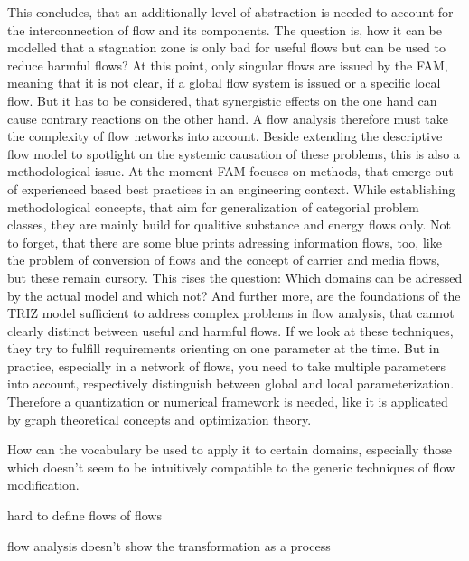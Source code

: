 \documentclass[a4paper,11pt]{article}
\begin{document}
        This concludes, that an additionally level of abstraction is needed to account for the interconnection of flow and its components. The question
        is, how it can be modelled that a stagnation zone is only bad for useful flows but can be used to reduce harmful flows?
        At this point, only singular flows are issued by the FAM, meaning that it is not clear, if a global flow system is issued or a specific local flow.
        But it has to be considered, that synergistic effects on the one hand can cause contrary reactions on the other hand. A flow analysis therefore must 
        take the complexity of flow networks into account. Beside extending the descriptive flow model to spotlight on the systemic causation of these problems, 
        this is also a methodological issue. At the moment FAM focuses on methods, that emerge out of experienced based best practices in an engineering context.
        While establishing methodological concepts, that aim for generalization of categorial problem classes,
        they are mainly build for qualitive substance and energy flows only. Not to forget, that there are some blue prints adressing information flows, too, like
        the problem of conversion of flows and the concept of carrier and media flows, but these remain cursory.
        This rises the question: Which domains can be adressed by the actual model and which not? And further more, are the foundations of the TRIZ model sufficient to address complex problems in flow analysis, that cannot clearly distinct between
        useful and harmful flows. If we look at these techniques, they try to fulfill requirements orienting on one parameter at the time.
        But in practice, especially in a network of flows, you need to take multiple parameters into account, respectively distinguish between global and local
        parameterization. Therefore a quantization or numerical framework is needed, like it is applicated by graph theoretical concepts and optimization theory. 
        
         



         

        How can the vocabulary be used to apply it to certain domains, especially those which doesn't seem to be intuitively compatible to the generic techniques
        of flow modification. 


        hard to define flows of flows

        flow analysis doesn't show the transformation as a process
\end{document}
